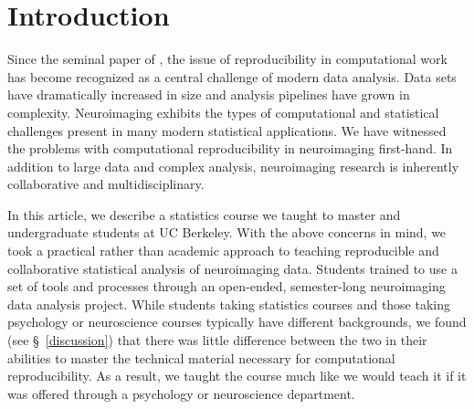 \section{Introduction}

Since the seminal paper of \citet{buckheit1995wavelab}, the issue of
reproducibility in computational work has become recognized as a
central challenge of modern data analysis.
Data sets have dramatically increased in size and
analysis pipelines have grown in complexity.
Neuroimaging exhibits the types of computational and statistical challenges
present in many modern statistical applications.
We have witnessed the problems with computational reproducibility in
neuroimaging first-hand.
In addition to large data and complex analysis,
neuroimaging research is inherently collaborative and
multidisciplinary.

In this article, we describe a statistics course we taught to master and
undergraduate students at UC Berkeley.
With the above concerns in mind, we took a practical rather than academic
approach to teaching reproducible and collaborative statistical analysis of
neuroimaging data.
Students trained to use a set of tools and processes through an open-ended,
semester-long neuroimaging data analysis project.
While students taking statistics courses and those taking psychology or
neuroscience courses typically have different backgrounds, we found (see
\S~\ref{discussion}) that there was little difference between the two in their
abilities to master the technical material necessary for computational
reproducibility.
As a result, we taught the course much like we would teach it if it was
offered through a psychology or neuroscience department.




